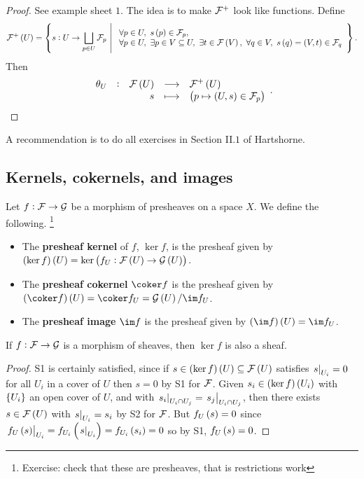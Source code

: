 \begin{proof}
See example sheet $ 1 $. The idea is to make $ \mathcal{F}^+ $ look like functions. Define
$$ \FFF^+\br{U} = \cbr{s : U \to \bigsqcup_{p \in U} \FFF_p \st \begin{array}{l} \forall p \in U, \ s\br{p} \in \FFF_p, \\ \forall p \in U, \ \exists p \in V \subseteq U, \ \exists t \in \FFF\br{V}, \ \forall q \in V, \ s\br{q} = \br{V, t} \in \FFF_q \end{array}}. $$
Then
$$ \function[\theta_U]{\FFF\br{U}}{\FFF^+\br{U}}{s}{\br{p \mapsto \br{U, s} \in \FFF_p}}. $$
\end{proof}

\begin{exercise*}
A recommendation is to do all exercises in Section II.$ 1 $ of Hartshorne.
\end{exercise*}

\pagebreak

\subsection{Kernels, cokernels, and images}


\begin{definition*}
Let $ f : \mathcal{F} \to \mathcal{G} $ be a morphism of presheaves on a space $ X $. We define the following. \footnote{Exercise: check that these are presheaves, that is restrictions work}
\begin{itemize}
\item The \textbf{presheaf kernel} of $ f $, $ \ker f $, is the presheaf given by $ \br{\ker f}\br{U} = \ker \br{f_U : \FFF\br{U} \to \GGG\br{U}} $.
\item The \textbf{presheaf cokernel} $ \coker f $ is the presheaf given by $ \br{\coker f}\br{U} = \coker f_U = \GGG\br{U} / \im f_U $.
\item The \textbf{presheaf image} $ \im f $ is the presheaf given by $ \br{\im f}\br{U} = \im f_U $.
\end{itemize}
\end{definition*}

\begin{remark}
If $ f : \mathcal{F} \to \mathcal{G} $ is a morphism of sheaves, then $ \ker f $ is also a sheaf.
\end{remark}

\begin{proof}
S1 is certainly satisfied, since if $ s \in \br{\ker f}\br{U} \subseteq \FFF\br{U} $ satisfies $ \left. s \right|_{U_i} = 0 $ for all $ U_i $ in a cover of $ U $ then $ s = 0 $ by S1 for $ \mathcal{F} $. Given $ s_i \in \br{\ker f}\br{U_i} $ with $ \cbr{U_i} $ an open cover of $ U $, and with $ \left. s_i \right|_{U_i \cap U_j} = \left. s_j \right|_{U_i \cap U_j} $, then there exists $ s \in \FFF\br{U} $ with $ \left. s \right|_{U_i} = s_i $ by S2 for $ \mathcal{F} $. But $ f_U\br{s} = 0 $ since $ \eval{f_U\br{s}}_{U_i} = f_{U_i}\br{\eval{s}_{U_i}} = f_{U_i}\br{s_i} = 0 $ so by S1, $ f_U\br{s} = 0 $.
\end{proof}

